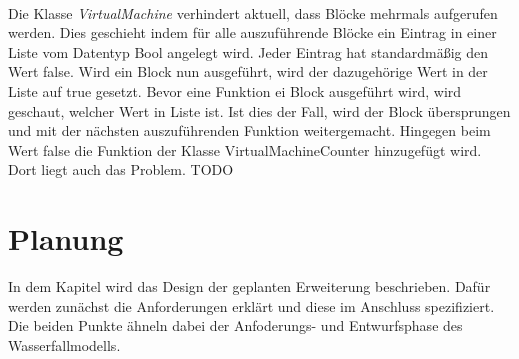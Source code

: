         \\
        Die Klasse \textit{VirtualMachine} verhindert aktuell, dass Blöcke mehrmals aufgerufen werden.
        Dies geschieht indem für alle auszuführende Blöcke ein Eintrag in einer Liste vom Datentyp Bool angelegt wird.
        Jeder Eintrag hat standardmäßig den Wert false. 
        Wird ein Block nun ausgeführt, wird der dazugehörige Wert in der Liste auf true gesetzt.
        Bevor eine Funktion ei Block ausgeführt wird, wird geschaut, welcher Wert in Liste ist.
        Ist dies der Fall, wird der Block übersprungen und mit der nächsten auszuführenden Funktion weitergemacht.
        Hingegen beim Wert false die Funktion der Klasse VirtualMachineCounter hinzugefügt wird.
        Dort liegt auch das Problem.
        TODO
    \newpage
    \chapter{Planung}
    In dem Kapitel wird das Design der geplanten Erweiterung beschrieben. 
    Dafür werden zunächst die Anforderungen erklärt und diese im Anschluss spezifiziert.
    Die beiden Punkte ähneln dabei der Anfoderungs- und Entwurfsphase des Wasserfallmodells.

